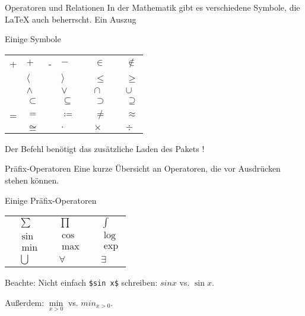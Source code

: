 \begin{frame}[fragile]{Operatoren und Relationen}
In der Mathematik gibt es verschiedene Symbole, die \LaTeX{} auch beherrscht. Ein Auszug
\begin{block}{Einige Symbole}
\begin{tabular}{*{4}{|rl}|}\hline
+ & $+$ & - & $-$ &  & $\in$ &  & $\notin$ \\
 & $\langle$ &  & $\rangle$ &  & $\leq$ &  & $\geq$ \\
 & $\wedge$ &  & $\vee$ &  & $\cap$ &  & $\cup$ \\
 & $\subset$ &  & $\subseteq$ &  & $\supset$ &  & $\supseteq$ \\
= & $=$ &  & $\coloneqq$ &  & $\neq$ &  & $\approx$\\
 & $\cong$ &  & $\cdot$ &  & $\times$ &  & $\div$ \\ \hline
\end{tabular}
\end{block}\pause
Der Befehl  benötigt das zusätzliche Laden des Pakets !
\end{frame}

\begin{frame}[fragile]{Präfix-Operatoren}
Eine kurze Übersicht an Operatoren, die vor Ausdrücken stehen können.
\begin{block}{Einige Präfix-Operatoren}
\center
\begin{tabular}{*{3}{|rl}|}\hline
{} & $\sum$ &  & $\prod$ &  & $\int$ \\
 & $\sin$ &  & $\cos$ &  & $\log$\\
 & $\min$ &  & $\max$ &  & $\exp$ \\
 & $\bigcup$ &  & $\forall$ &  & $\exists$ \\ \hline
\end{tabular}
\end{block}\pause
\alert{Beachte:} Nicht einfach \texttt{\$sin x\$} schreiben: $sin x$ vs. $\sin x$. 

\medskip\pause
Außerdem: $\min\limits_{x>0}$ vs. $min_{x>0}$. 
\end{frame}

